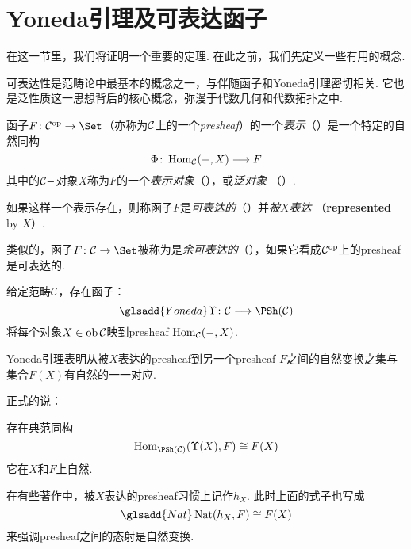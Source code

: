\section{Yoneda引理及可表达函子}
  在这一节里，我们将证明一个重要的定理. 在此之前，我们先定义一些有用的概念.

  可表达性是范畴论中最基本的概念之一，与伴随函子和Yoneda引理密切相关. 它也是泛性质这一思想背后的核心概念，弥漫于代数几何和代数拓扑之中.
  \begin{defn}
    函子$F\colon\Cc^{\op}\to\Set$（亦称为${\cal C}$上的一个\emph{presheaf}）的一个\emph{表示}（）是一个特定的自然同构
    \begin{equation*}
      \Phi\colon\operatorname{Hom}_{{\cal C}}(-,X)\longrightarrow F
    \end{equation*}
    其中的${\cal C}-$对象$X$称为$F$的一个\emph{表示对象}（），或\emph{泛对象} （）.

    如果这样一个表示存在，则称函子$F$是\emph{可表达的}（）并\emph{被$X$表达}
    （\textbf{represented} by $X$）.

    类似的，函子$F\colon\Cc\to\Set$被称为是\emph{余可表达的}（），如果它看成${\cal C}^{\operatorname{op}}$上的presheaf是可表达的.
  \end{defn}

  给定范畴${\cal C}$，存在函子：
  \begin{equation*}\glsadd{Yoneda}
    \Upsilon\colon\Cc\To\PSh(\Cc)
  \end{equation*}
  将每个对象$X\in\operatorname{ob}{\cal C}$映到presheaf $\operatorname{Hom}_{{\cal C}}(-,X)$.

  Yoneda引理表明从被$X$表达的presheaf到另一个presheaf $F$之间的自然变换之集与集合$F(X)$有自然的一一对应.

  正式的说：
  \begin{thm}[Yoneda引理]
    存在典范同构
    \begin{equation*}
      \Hom_{\PSh(\Cc)}(\Upsilon(X),F)\cong F(X)
    \end{equation*}
    它在$X$和$F$上自然.
  \end{thm}
  \begin{rem}
    在有些著作中，被$X$表达的presheaf习惯上记作$h_X$. 此时上面的式子也写成
    \begin{equation*}\glsadd{Nat}
      \Nat(h_X,F)\cong F(X)
    \end{equation*}
    来强调presheaf之间的态射是自然变换.
  \end{rem}

